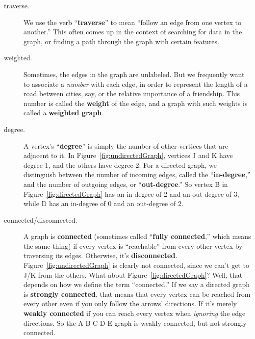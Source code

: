 \begin{alttitles}
\begin{description}

\item[traverse.] We use the verb ``\textbf{traverse}'' to mean ``follow an edge
from one vertex to another.'' This often comes up in the context of searching
for data in the graph, or finding a path through the graph with certain
features.


\item [weighted.] Sometimes, the edges in the graph are unlabeled. But we
frequently want to associate a \textit{number} with each edge, in order to
represent the length of a road between cities, say, or the relative importance
of a friendship. This number is called the \textbf{weight} of the edge, and a
graph with such weights is called a \textbf{weighted graph}.


\item [degree.] A vertex's ``\textbf{degree}'' is simply the number of other
vertices that are adjacent to it. In Figure~\ref{fig:undirectedGraph}, vertices J
and K have degree 1, and the others have degree 2. For a directed graph, we
distinguish between the number of incoming edges, called the
``\textbf{in-degree},'' and the number of outgoing edges, or
``\textbf{out-degree}.'' So vertex B in Figure~\ref{fig:directedGraph} has an
in-degree of 2 and an out-degree of 3, while D has an in-degree of 0 and an
out-degree of 2.


\item[connected/disconnected.] A graph is \textbf{connected} (sometimes called
``\textbf{fully connected},'' which means the same thing) if every vertex is
``reachable'' from every other vertex by traversing its edges. Otherwise, it's
\textbf{disconnected}. Figure~\ref{fig:undirectedGraph} is clearly not
connected, since we can't get to J/K from the others. What about
Figure~\ref{fig:directedGraph}? Well, that depends on how we define the term
``connected.'' If we say a directed graph is \textbf{strongly connected}, that
means that every vertex can be reached from every other even if you only follow
the arrows' directions. If it's merely \textbf{weakly connected} if you can
reach every vertex when \textit{ignoring} the edge directions. So the A-B-C-D-E
graph is weakly connected, but not strongly connected.


\end{description}
\end{alttitles}
